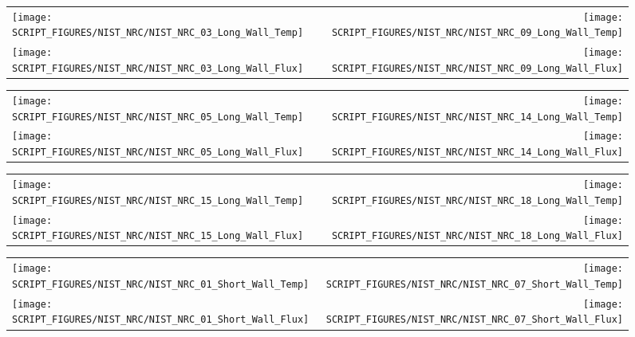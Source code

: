 \clearpage

\begin{figure}[p]
\begin{tabular*}{\textwidth}{l@{\extracolsep{\fill}}r}
\texttt{[image: SCRIPT\_FIGURES/NIST\_NRC/NIST\_NRC\_03\_Long\_Wall\_Temp]} &
\texttt{[image: SCRIPT\_FIGURES/NIST\_NRC/NIST\_NRC\_09\_Long\_Wall\_Temp]} \\
\texttt{[image: SCRIPT\_FIGURES/NIST\_NRC/NIST\_NRC\_03\_Long\_Wall\_Flux]} &
\texttt{[image: SCRIPT\_FIGURES/NIST\_NRC/NIST\_NRC\_09\_Long\_Wall\_Flux]}
\end{tabular*}
\label{NIST_NRCLong_Wall_3_and_9}
\end{figure}

\begin{figure}[p]
\begin{tabular*}{\textwidth}{l@{\extracolsep{\fill}}r}
\texttt{[image: SCRIPT\_FIGURES/NIST\_NRC/NIST\_NRC\_05\_Long\_Wall\_Temp]} &
\texttt{[image: SCRIPT\_FIGURES/NIST\_NRC/NIST\_NRC\_14\_Long\_Wall\_Temp]} \\
\texttt{[image: SCRIPT\_FIGURES/NIST\_NRC/NIST\_NRC\_05\_Long\_Wall\_Flux]} &
\texttt{[image: SCRIPT\_FIGURES/NIST\_NRC/NIST\_NRC\_14\_Long\_Wall\_Flux]}
\end{tabular*}
\label{NIST_NRCLong_Wall_5_and_14}
\end{figure}

\clearpage

\begin{figure}[p]
\begin{tabular*}{\textwidth}{l@{\extracolsep{\fill}}r}
\texttt{[image: SCRIPT\_FIGURES/NIST\_NRC/NIST\_NRC\_15\_Long\_Wall\_Temp]} &
\texttt{[image: SCRIPT\_FIGURES/NIST\_NRC/NIST\_NRC\_18\_Long\_Wall\_Temp]} \\
\texttt{[image: SCRIPT\_FIGURES/NIST\_NRC/NIST\_NRC\_15\_Long\_Wall\_Flux]} &
\texttt{[image: SCRIPT\_FIGURES/NIST\_NRC/NIST\_NRC\_18\_Long\_Wall\_Flux]}
\end{tabular*}
\label{NIST_NRCLong_Wall_15_and_18}
\end{figure}

\clearpage

\begin{figure}[p]
\begin{tabular*}{\textwidth}{l@{\extracolsep{\fill}}r}
\texttt{[image: SCRIPT\_FIGURES/NIST\_NRC/NIST\_NRC\_01\_Short\_Wall\_Temp]} &
\texttt{[image: SCRIPT\_FIGURES/NIST\_NRC/NIST\_NRC\_07\_Short\_Wall\_Temp]} \\
\texttt{[image: SCRIPT\_FIGURES/NIST\_NRC/NIST\_NRC\_01\_Short\_Wall\_Flux]} &
\texttt{[image: SCRIPT\_FIGURES/NIST\_NRC/NIST\_NRC\_07\_Short\_Wall\_Flux]}
\end{tabular*}
\label{NIST_NRCShort_Wall_1_and_7}
\end{figure}

